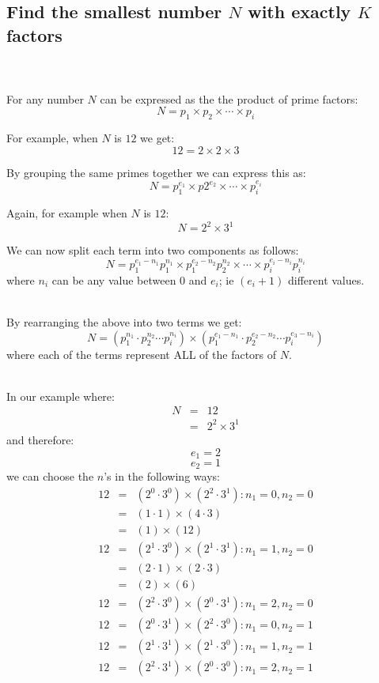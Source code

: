 \documentclass{article}
\begin{document}
\thispagestyle{empty}

\begin{center}
\section*{Find the smallest number $N$ with exactly $K$ factors}
\end{center}
\\~\\

For any number $N$ can be expressed as the the product of prime factors:
$$
N = p_1 \times p_2 \times \cdots \times p_i
$$

For example, when $N$ is $12$ we get:
$$
12 = 2 \times 2 \times 3
$$

By grouping the same primes together we can express this as:
$$
N = p_1 ^ {e_1} \times p2 ^ {e_2} \times 
\cdots \times p_i ^ {e_i}
$$

Again, for example when $N$ is $12$:
$$
N = 2 ^ 2 \times 3 ^ 1
$$

We can now split each term into two components as follows:
$$
N = 
p_1 ^ {e_1 - n_1} p_1 ^ {n_1} \times 
p_1 ^ {e_2 - n_2} p_2 ^ {n_2} \times 
\cdots \times 
p_i ^ {e_i - n_i} p_i ^ {n_i} 
$$
where $n_i$ can be any value between $0$ and $e_i$; ie $(e_i + 1)$ different values.
\\~
\par
By rearranging the above into two terms we get:
$$
N = 
( 
p_1 ^ {n_1} \cdot
p_2 ^ {n_2} 
\cdots 
p_i ^ {n_i}
)
\times
(
p_1 ^ {e_1 - n_1} \cdot
p_2 ^ {e_2 - n_2}
\cdots
p_i ^ {e_3 - n_i}
)
$$
where each of the terms represent ALL of the factors of $N$.
\\~
\par
In our example where:
\begin{eqnarray*}
N & = & 12\\
& = & 2 ^ 2 \times 3 ^ 1
\end{eqnarray*}
and therefore:
$$e_1 = 2$$
$$e_2 = 1$$
we can choose the $n$'s in the following ways:
\begin{eqnarray*}
12 &=& (2^0 \cdot 3^0) \times (2^2 \cdot 3^1) : n_1 = 0, n_2 = 0 \\
   &=& (1 \cdot 1) \times (4 \cdot 3) \\
   &=& (1) \times (12) \\
12 &=& (2^1 \cdot 3^0) \times (2^1 \cdot 3^1) : n_1 = 1, n_2 = 0\\
   &=& (2 \cdot 1) \times (2 \cdot 3) \\
   &=& (2) \times (6) \\
12 &=& (2^2 \cdot 3^0) \times (2^0 \cdot 3^1) : n_1 = 2, n_2 = 0\\
12 &=& (2^0 \cdot 3^1) \times (2^2 \cdot 3^0) : n_1 = 0, n_2 = 1\\
12 &=& (2^1 \cdot 3^1) \times (2^1 \cdot 3^0) : n_1 = 1, n_2 = 1\\
12 &=& (2^2 \cdot 3^1) \times (2^0 \cdot 3^0) : n_1 = 2, n_2 = 1\\
\end{eqnarray*}
\end{document}
